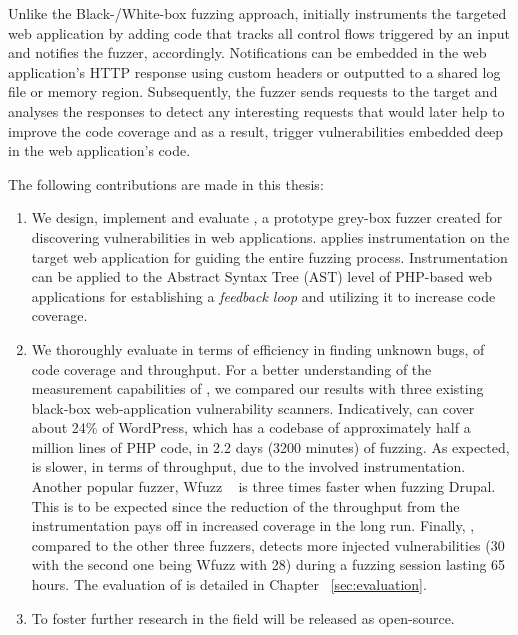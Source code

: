 Unlike the Black-/White-box fuzzing approach, \pname{} initially instruments the targeted web application by adding code that tracks all control flows triggered by an input and notifies the fuzzer, accordingly. Notifications can be embedded in the web application's HTTP response using custom headers or outputted to a shared log file or memory region. Subsequently, the fuzzer sends requests to the target and analyses the responses to detect any interesting requests that would later help to improve the code coverage and as a result, trigger vulnerabilities embedded deep in the web application's code.

The following contributions are made in this thesis:

\begin{enumerate}

\item We design, implement and evaluate \pname{}, a prototype grey-box fuzzer created for discovering vulnerabilities in web applications. \pname{} applies instrumentation on the target web application for guiding the entire fuzzing process. Instrumentation can be applied to the Abstract Syntax Tree (AST) level of PHP-based web applications for establishing a \emph{feedback loop} and utilizing it to increase code coverage.
\item We thoroughly evaluate \pname{} in terms of efficiency in finding unknown bugs, of code coverage and throughput. For a better understanding of the measurement capabilities of \pname{}, we compared our results with three existing black-box web-application vulnerability scanners. Indicatively, \pname{} can cover about 24\% of WordPress, which has a codebase of approximately half a million lines of PHP code, in 2.2 days (3200 minutes) of fuzzing. As expected, \pname{} is slower, in terms of throughput, due to the involved instrumentation. Another popular fuzzer, Wfuzz ~\cite{wfuzz} is three times faster when fuzzing Drupal. This is to be expected since the reduction of the throughput from the instrumentation pays off in increased coverage in the long run. Finally, \pname{}, compared to the other three fuzzers, detects more injected vulnerabilities (30 with the second one being Wfuzz with 28) during a fuzzing session lasting 65 hours. The evaluation of \pname{} is detailed in Chapter ~\ref{sec:evaluation}.
\item To foster further research in the field \pname{} will be released as open-source.

\end{enumerate}

